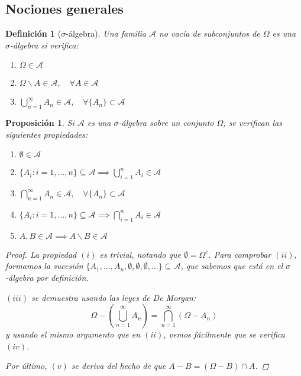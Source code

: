 \documentclass[11pt, a4paper]{article}
\theoremstyle{theorem-style}
\newtheorem{nprop}{Proposición}[section]
\theoremstyle{definition-style}
\newtheorem{ndef}{Definición}[section]
\theoremstyle{remark-style}
\theoremstyle{example-style}
\newenvironment{nlist}
{\begin{enumerate}
\renewcommand\labelenumi{(\emph{\roman{enumi})}}}
{\end{enumerate}}
\begin{document}
\subsection{Nociones generales}

\begin{ndef}[$\sigma$-álgebra] Una familia $\mathcal A$ no vacía de subconjuntos de $\Omega$ es una \mbox{$\sigma$-álgebra} si verifica:

\begin{nlist}
    \item $\Omega \in \mathcal A$
	\item $\displaystyle \Omega \backslash A \in \mathcal{A}, \quad \forall A \in \mathcal{A}$
	\item $\displaystyle \bigcup_{n=1}^\infty A_n \in \mathcal{A}, \quad \forall \{A_n\} \subset \mathcal{A}$
\end{nlist}
	
\end{ndef}

\begin{nprop}
	Si $\mathcal A$ es una $\sigma$-álgebra sobre un conjunto $\Omega$, se verifican las siguientes propiedades: 
	
\begin{nlist}
	\item $\emptyset \in \mathcal A$
	\item $\displaystyle \{A_i : i = 1,\dots,n\} \subseteq \mathcal{A} \implies \bigcup_{i=1}^n A_i \in \mathcal{A}$
    \item $\displaystyle \bigcap_{n=1}^\infty A_n \in \mathcal{A}, \quad \forall \{A_n\} \subset \mathcal{A}$
	\item $\displaystyle \{A_i : i = 1,\dots,n\} \subseteq \mathcal{A} \implies \bigcap_{i=1}^n A_i \in \mathcal{A}$
	\item $A,B \in \mathcal A \implies A \backslash B \in \mathcal A$
\end{nlist}

\begin{proof}
	La propiedad $(i)$ es trivial, notando que $\emptyset = \Omega^c$. Para comprobar $(ii)$, formamos la sucesión $\{A_1,\dots,A_n,\emptyset,\emptyset, \emptyset, \dots\} \subseteq \mathcal A$, que sabemos que está en el $\sigma$-álgebra por definición.
	
	$(iii)$ se demuestra usando las leyes de De Morgan: $$\Omega - \left( \bigcup_{n=1}^\infty A_n \right) = \bigcap_{n=1}^\infty (\Omega - A_n)$$ y usando el mismo argumento que en $(ii)$, vemos fácilmente que se verifica $(iv)$.
	
	Por último, $(v)$ se deriva del hecho de que $A - B = (\Omega - B) \cap A$.
\end{proof}
\end{nprop}
\end{document}
